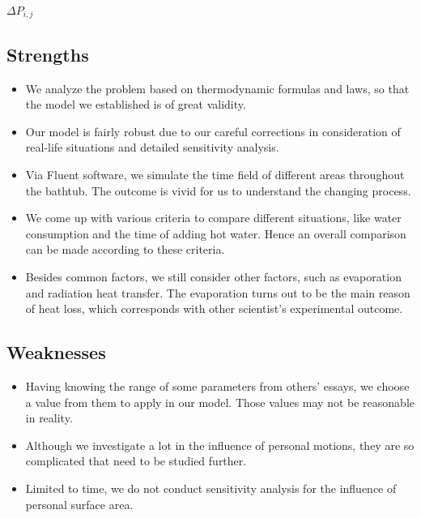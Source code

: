 \documentclass{mcmthesis}
\begin{document}
$\Delta P_{i, j}$

\subsection{Strengths}

\begin{itemize}
\item We analyze the problem based on thermodynamic formulas and laws, so that the model we established is of great validity.

\item Our model is fairly robust due to our careful corrections in consideration of real-life situations and detailed sensitivity analysis.

\item Via Fluent software, we simulate the time field of different areas throughout the bathtub. The outcome is vivid for us to understand the changing process.

\item We come up with various criteria to compare different situations, like water consumption and the time of adding hot water. Hence an overall comparison can be made according to these criteria.

\item Besides common factors, we still consider other factors, such as evaporation and radiation heat transfer. The evaporation turns out to be the main reason of heat loss, which corresponds with other scientist’s experimental outcome.
\end{itemize}

\subsection{Weaknesses}

\begin{itemize}
\item Having knowing the range of some parameters from others’ essays, we choose a value from them to apply in our model. Those values may not be reasonable in reality.

\item Although we investigate a lot in the influence of personal motions, they are so complicated that need to be studied further.

\item Limited to time, we do not conduct sensitivity analysis for the influence of personal surface area.
\end{itemize}
\end{document}
